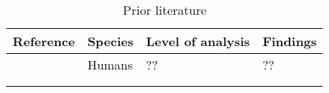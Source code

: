 
\begin{table}[h]
\centering
\footnotesize
\caption{Prior literature}
\label{tbl_literature}

\begin{tabularx}{\linewidth}{XXXX}
\toprule
Reference & Species & Level of analysis & Findings \\
\midrule
        \textcite{Placeholder1000}  &  Humans &  ??  & ?? \\
          &         &                  &          \\
          &         &                  &          \\
\bottomrule
\end{tabularx}

\end{table}